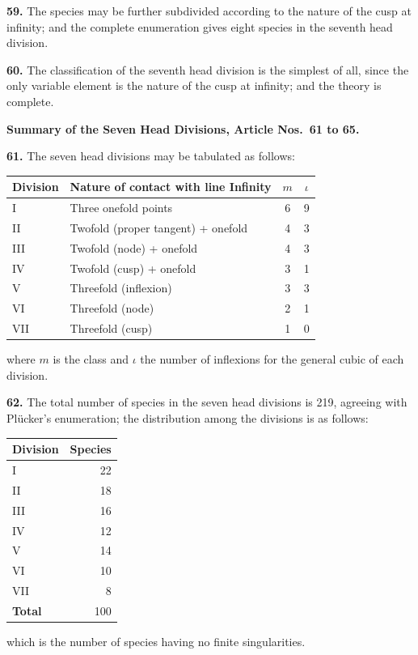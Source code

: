 \documentclass[11pt,a4paper]{article}
\theoremstyle{plain}
\theoremstyle{definition}
\begin{document}
\textbf{59.} The species may be further subdivided according to the nature of the cusp at infinity; and the complete enumeration gives eight species in the seventh head division.

\textbf{60.} The classification of the seventh head division is the simplest of all, since the only variable element is the nature of the cusp at infinity; and the theory is complete.

\bigskip

\noindent\textbf{Summary of the Seven Head Divisions, Article Nos.~61 to 65.}

\medskip

\textbf{61.} The seven head divisions may be tabulated as follows:
\begin{center}
\begin{tabular}{@{}llcc@{}}
\toprule
\textbf{Division} & \textbf{Nature of contact with line Infinity} & $m$ & $\iota$ \\
\midrule
I & Three onefold points & 6 & 9 \\
II & Twofold (proper tangent) + onefold & 4 & 3 \\
III & Twofold (node) + onefold & 4 & 3 \\
IV & Twofold (cusp) + onefold & 3 & 1 \\
V & Threefold (inflexion) & 3 & 3 \\
VI & Threefold (node) & 2 & 1 \\
VII & Threefold (cusp) & 1 & 0 \\
\bottomrule
\end{tabular}
\end{center}
where $m$ is the class and $\iota$ the number of inflexions for the general cubic of each division.

\textbf{62.} The total number of species in the seven head divisions is 219, agreeing with Pl\"{u}cker's enumeration; the distribution among the divisions is as follows:
\begin{center}
\begin{tabular}{@{}lr@{}}
\toprule
\textbf{Division} & \textbf{Species} \\
\midrule
I & 22 \\
II & 18 \\
III & 16 \\
IV & 12 \\
V & 14 \\
VI & 10 \\
VII & 8 \\
\midrule
\textbf{Total} & 100 \\
\bottomrule
\end{tabular}
\end{center}
which is the number of species having no finite singularities.
\end{document}
